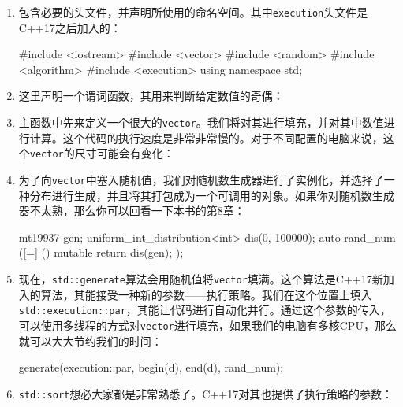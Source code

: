\begin{enumerate}
\item 包含必要的头文件，并声明所使用的命名空间。其中\texttt{execution}头文件是C++17之后加入的：

\begin{codebox}[cpp]
#include <iostream>
#include <vector>
#include <random>
#include <algorithm>
#include <execution>
using namespace std;
\end{codebox}

\item 这里声明一个谓词函数，其用来判断给定数值的奇偶：


\item 主函数中先来定义一个很大的\texttt{vector}。我们将对其进行填充，并对其中数值进行计算。这个代码的执行速度是非常非常慢的。对于不同配置的电脑来说，这个\texttt{vector}的尺寸可能会有变化：

\begin{codebox}[cpp]
int main()
{
    vector<int> d (50000000);
\end{codebox}

\item 为了向\texttt{vector}中塞入随机值，我们对随机数生成器进行了实例化，并选择了一种分布进行生成，并且将其打包成为一个可调用的对象。如果你对随机数生成器不太熟，那么你可以回看一下本书的第8章：

\begin{codebox}[cpp]
    mt19937 gen;
    uniform_int_distribution<int> dis(0, 100000);
    auto rand_num ([=] () mutable { return dis(gen); }); 
\end{codebox}

\item 现在，\texttt{std::generate}算法会用随机值将\texttt{vector}填满。这个算法是C++17新加入的算法，其能接受一种新的参数——执行策略。我们在这个位置上填入\texttt{std::execution::par}，其能让代码进行自动化并行。通过这个参数的传入，可以使用多线程的方式对\texttt{vector}进行填充，如果我们的电脑有多核CPU，那么就可以大大节约我们的时间：

\begin{codebox}[cpp]
    generate(execution::par, begin(d), end(d), rand_num);
\end{codebox}

\item \texttt{std::sort}想必大家都是非常熟悉了。C++17对其也提供了执行策略的参数：


\end{enumerate}
